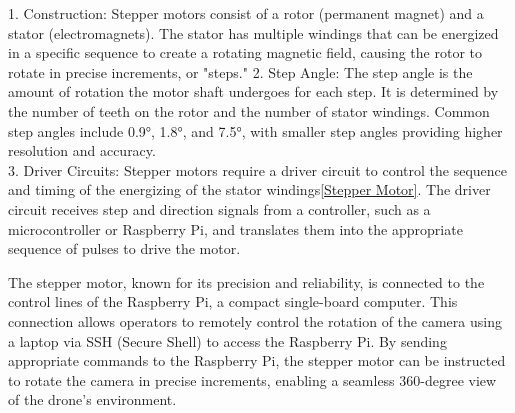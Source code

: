 \documentclass[conference]{IEEEtran}
\begin{document}
1. Construction: Stepper motors consist of a rotor (permanent magnet) and a stator (electromagnets). The stator has multiple windings that can be energized in a specific sequence to create a rotating magnetic field, causing the rotor to rotate in precise increments, or "steps."\cite{stepper}
2. Step Angle: The step angle is the amount of rotation the motor shaft undergoes for each step. It is determined by the number of teeth on the rotor and the number of stator windings. Common step angles include 0.9°, 1.8°, and 7.5°, with smaller step angles providing higher resolution and accuracy.\\
3. Driver Circuits: Stepper motors require a driver circuit to control the sequence and timing of the energizing of the stator windings\ref{Stepper Motor}. The driver circuit receives step and direction signals from a controller, such as a microcontroller or Raspberry Pi, and translates them into the appropriate sequence of pulses to drive the motor.

The stepper motor, known for its precision and reliability, is connected to the control lines of the Raspberry Pi, a compact single-board computer. This connection allows operators to remotely control the rotation of the camera using a laptop via SSH (Secure Shell) to access the Raspberry Pi. By sending appropriate commands to the Raspberry Pi, the stepper motor can be instructed to rotate the camera in precise increments, enabling a seamless 360-degree view of the drone's environment\cite{rasp}.



\end{document}
